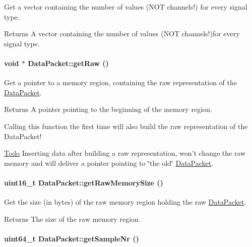 Get a vector containing the number of values (NOT channels!) for every signal type. \begin{DoxyReturn}{Returns}
A vector containing the number of values (NOT channels!)for every signal type. 
\end{DoxyReturn}
\hypertarget{class_data_packet_a6d05054482f9844487d5253a1b903a1e}{
\paragraph[{getRaw}]{\setlength{\rightskip}{0pt plus 5cm}void $\ast$ DataPacket::getRaw ()}\hfill}
\label{class_data_packet_a6d05054482f9844487d5253a1b903a1e}


Get a pointer to a memory region, containing the raw representation of the \hyperlink{class_data_packet}{DataPacket}. \begin{DoxyReturn}{Returns}
A pointer pointing to the beginning of the memory region.
\end{DoxyReturn}
Calling this function the first time will also build the raw representation of the DataPacket! \begin{Desc}
\item[\hyperlink{todo__todo000006}{Todo}]Inserting data after building a raw representation, won't change the raw memory and will deliver a pointer pointing to \char`\"{}the old\char`\"{} \hyperlink{class_data_packet}{DataPacket}. \end{Desc}
\hypertarget{class_data_packet_a20f62ad94659c0f7f2faf143084764e5}{
\paragraph[{getRawMemorySize}]{\setlength{\rightskip}{0pt plus 5cm}uint16\_\-t DataPacket::getRawMemorySize ()}\hfill}
\label{class_data_packet_a20f62ad94659c0f7f2faf143084764e5}


Get the size (in bytes) of the raw memory region holding the raw \hyperlink{class_data_packet}{DataPacket}. \begin{DoxyReturn}{Returns}
The size of the raw memory region. 
\end{DoxyReturn}
\hypertarget{class_data_packet_a74e9c0a441f1bb05d1134cc1a10f2cb6}{
\paragraph[{getSampleNr}]{\setlength{\rightskip}{0pt plus 5cm}uint64\_\-t DataPacket::getSampleNr ()}\hfill}
\label{class_data_packet_a74e9c0a441f1bb05d1134cc1a10f2cb6}


